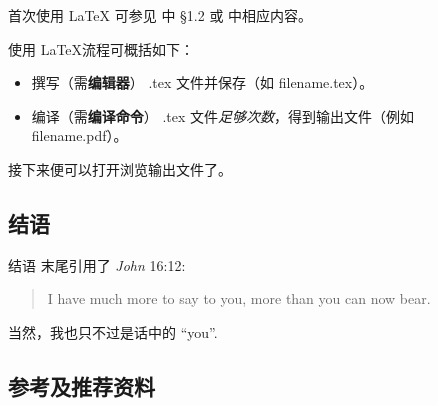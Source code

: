 \documentclass{beamer}
\begin{document}
\begin{frame}{首次使用 \LaTeX}
可参见 \cite{lshort-cn} 中 \S{}1.2 或 \cite{install-latex} 中相应内容。

使用 \LaTeX 流程可概括如下：
\begin{itemize}
\item 撰写（需\textbf{编辑器}） .tex 文件并保存（如 filename.tex）。
\item 编译（需\textbf{编译命令}） .tex 文件\emph{足够次数}，得到输出文件（例如 filename.pdf）。
\end{itemize}
接下来便可以打开浏览输出文件了。
\end{frame}

\subsection{结语}
\begin{frame}{结语}
\cite{Kostrikin} 末尾引用了 \emph{John} 16:12\cite{John-16}:
\begin{quote}
I have much more to say to you, more than you can now bear.
\end{quote}

当然，我也只不过是话中的 ``you''.
\end{frame}

\subsection{参考及推荐资料}
\begin{frame}[t,allowframebreaks]
\printbibliography[heading=none]
\end{frame}
\end{document}
